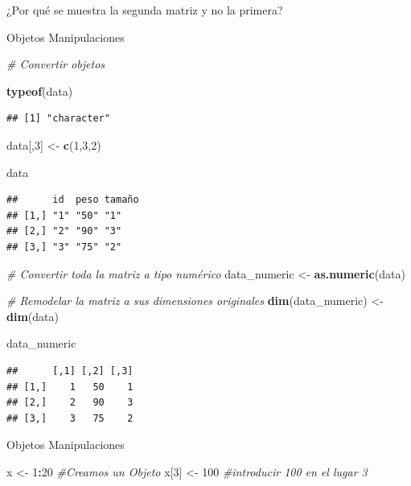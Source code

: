 \documentclass[
  ignorenonframetext,
]{beamer}
\newenvironment{Shaded}{\begin{snugshade}}{\end{snugshade}}
\newcommand{\CommentTok}[1]{\textcolor[rgb]{0.56,0.35,0.01}{\textit{#1}}}
\newcommand{\DecValTok}[1]{\textcolor[rgb]{0.00,0.00,0.81}{#1}}
\newcommand{\FunctionTok}[1]{\textcolor[rgb]{0.13,0.29,0.53}{\textbf{#1}}}
\newcommand{\NormalTok}[1]{#1}
\newcommand{\OtherTok}[1]{\textcolor[rgb]{0.56,0.35,0.01}{#1}}
\newcommand{\SpecialCharTok}[1]{\textcolor[rgb]{0.81,0.36,0.00}{\textbf{#1}}}
\begin{document}
\begin{frame}[fragile]{¿Por qué se muestra la segunda matriz y no la
primera?}
\begin{block}{Objetos \textbar{} Manipulaciones}
\protect\hypertarget{objetos-manipulaciones-2}{}
\begin{Shaded}
\begin{Highlighting}[]
\CommentTok{\# Convertir objetos}

\FunctionTok{typeof}\NormalTok{(data)}
\end{Highlighting}
\end{Shaded}

\begin{verbatim}
## [1] "character"
\end{verbatim}

\begin{Shaded}
\begin{Highlighting}[]
\NormalTok{data[,}\DecValTok{3}\NormalTok{] }\OtherTok{\textless{}{-}} \FunctionTok{c}\NormalTok{(}\DecValTok{1}\NormalTok{,}\DecValTok{3}\NormalTok{,}\DecValTok{2}\NormalTok{)}

\NormalTok{data}
\end{Highlighting}
\end{Shaded}

\begin{verbatim}
##      id  peso tamaño
## [1,] "1" "50" "1"   
## [2,] "2" "90" "3"   
## [3,] "3" "75" "2"
\end{verbatim}

\begin{Shaded}
\begin{Highlighting}[]
\CommentTok{\# Convertir toda la matriz a tipo numérico}
\NormalTok{data\_numeric }\OtherTok{\textless{}{-}} \FunctionTok{as.numeric}\NormalTok{(data)}

\CommentTok{\# Remodelar la matriz a sus dimensiones originales}
\FunctionTok{dim}\NormalTok{(data\_numeric) }\OtherTok{\textless{}{-}} \FunctionTok{dim}\NormalTok{(data)}

\NormalTok{data\_numeric}
\end{Highlighting}
\end{Shaded}

\begin{verbatim}
##      [,1] [,2] [,3]
## [1,]    1   50    1
## [2,]    2   90    3
## [3,]    3   75    2
\end{verbatim}
\end{block}

\begin{block}{Objetos \textbar{} Manipulaciones}
\protect\hypertarget{objetos-manipulaciones-3}{}
\begin{Shaded}
\begin{Highlighting}[]
\NormalTok{x }\OtherTok{\textless{}{-}} \DecValTok{1}\SpecialCharTok{:}\DecValTok{20} \CommentTok{\#Creamos un Objeto}
\NormalTok{x[}\DecValTok{3}\NormalTok{] }\OtherTok{\textless{}{-}} \DecValTok{100} \CommentTok{\#introducir 100 en el lugar 3}


\end{Highlighting}
\end{Shaded}
\end{block}
\end{frame}
\end{document}
